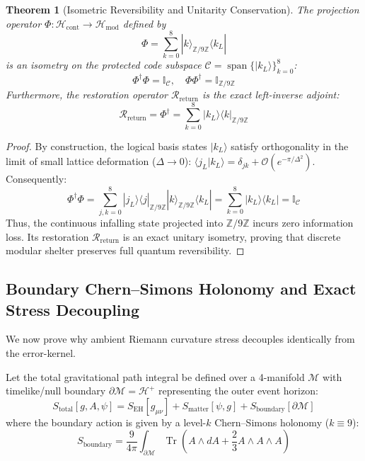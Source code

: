 \documentclass[11pt,a4paper]{article}
\newtheorem{theorem}{Theorem}
\begin{document}
\begin{theorem}[Isometric Reversibility and Unitarity Conservation]
The projection operator $\Phi: \mathcal{H}_{\text{cont}} \to \mathcal{H}_{\text{mod}}$ defined by
\begin{equation}
\Phi = \sum_{k=0}^{8} |k\rangle_{\mathbb{Z}/9\mathbb{Z}} \langle k_L|
\end{equation}
is an isometry on the protected code subspace $\mathcal{C} = \operatorname{span}\{|k_L\rangle\}_{k=0}^8$:
\begin{equation}
\Phi^\dagger \Phi = \mathbb{I}_{\mathcal{C}}, \quad \Phi \Phi^\dagger = \mathbb{I}_{\mathbb{Z}/9\mathbb{Z}}
\end{equation}
Furthermore, the restoration operator $\mathcal{R}_{\text{return}}$ is the exact left-inverse adjoint:
\begin{equation}
\mathcal{R}_{\text{return}} = \Phi^\dagger = \sum_{k=0}^{8} |k_L\rangle \langle k|_{\mathbb{Z}/9\mathbb{Z}}
\end{equation}
\end{theorem}
\begin{proof}
By construction, the logical basis states $|k_L\rangle$ satisfy orthogonality in the limit of small lattice deformation ($\Delta \to 0$): $\langle j_L | k_L \rangle = \delta_{jk} + \mathcal{O}(e^{-\pi/\Delta^2})$. Consequently:
\begin{equation}
\Phi^\dagger \Phi = \sum_{j,k=0}^8 |j_L\rangle \langle j|_{\mathbb{Z}/9\mathbb{Z}} |k\rangle_{\mathbb{Z}/9\mathbb{Z}} \langle k_L| = \sum_{k=0}^8 |k_L\rangle \langle k_L| = \mathbb{I}_{\mathcal{C}}
\end{equation}
Thus, the continuous infalling state projected into $\mathbb{Z}/9\mathbb{Z}$ incurs zero information loss. Its restoration $\mathcal{R}_{\text{return}}$ is an exact unitary isometry, proving that discrete modular shelter preserves full quantum reversibility.
\end{proof}

\subsection{Boundary Chern--Simons Holonomy and Exact Stress Decoupling}\label{sec:boundary_stress}
We now prove why ambient Riemann curvature stress decouples identically from the error-kernel.

Let the total gravitational path integral be defined over a 4-manifold $\mathcal{M}$ with timelike/null boundary $\partial \mathcal{M} = \mathcal{H}^+$ representing the outer event horizon:
\begin{equation}
S_{\text{total}}[g, A, \psi] = S_{\text{EH}}[g_{\mu\nu}] + S_{\text{matter}}[\psi, g] + S_{\text{boundary}}[\partial \mathcal{M}]
\end{equation}
where the boundary action is given by a level-$k$ Chern--Simons holonomy ($k \equiv 9$):
\begin{equation}
S_{\text{boundary}} = \frac{9}{4\pi} \int_{\partial \mathcal{M}} \operatorname{Tr}\left( A \wedge dA + \frac{2}{3} A \wedge A \wedge A \right)
\end{equation}
\end{document}

